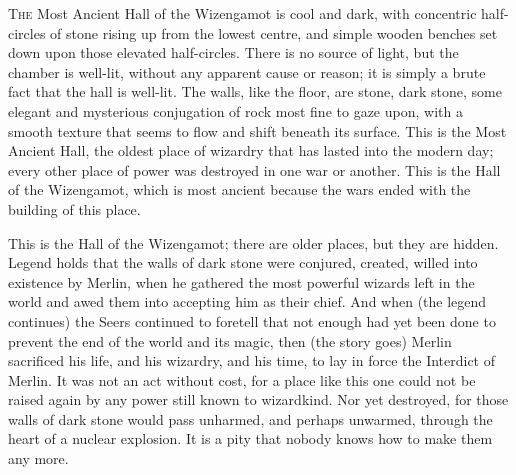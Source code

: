 
\lettrine{T}{he} Most Ancient Hall of the Wizengamot is cool and dark, with concentric half-circles of stone rising up from the lowest centre, and simple wooden benches set down upon those elevated half-circles. There is no source of light, but the chamber is well-lit, without any apparent cause or reason; it is simply a brute fact that the hall is well-lit. The walls, like the floor, are stone, dark stone, some elegant and mysterious conjugation of rock most fine to gaze upon, with a smooth texture that seems to flow and shift beneath its surface. This is the Most Ancient Hall, the oldest place of wizardry that has lasted into the modern day; every other place of power was destroyed in one war or another. This is the Hall of the Wizengamot, which is most ancient because the wars ended with the building of this place.

This is the Hall of the Wizengamot; there are older places, but they are hidden. Legend holds that the walls of dark stone were conjured, created, willed into existence by Merlin, when he gathered the most powerful wizards left in the world and awed them into accepting him as their chief. And when (the legend continues) the Seers continued to foretell that not enough had yet been done to prevent the end of the world and its magic, then (the story goes) Merlin sacrificed his life, and his wizardry, and his time, to lay in force the Interdict of Merlin. It was not an act without cost, for a place like this one could not be raised again by any power still known to wizardkind. Nor yet destroyed, for those walls of dark stone would pass unharmed, and perhaps unwarmed, through the heart of a nuclear explosion. It is a pity that nobody knows how to make them any more.

